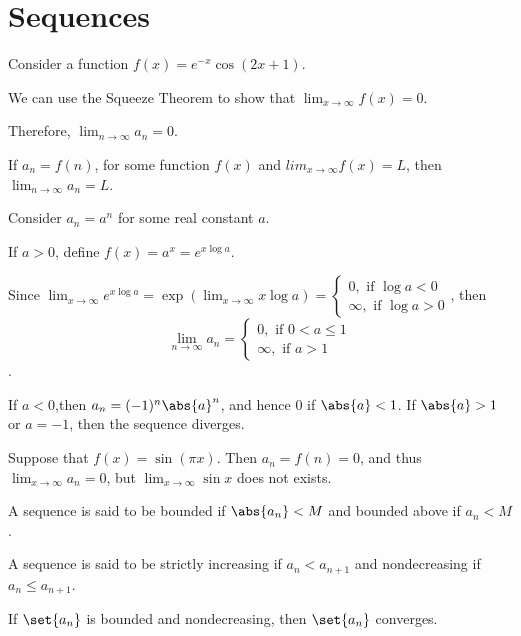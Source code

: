 \documentclass[11pt]{scrartcl}
\begin{document}
\section{Sequences}

Consider a function $f(x) = e^{-x}\cos(2x+1)$.

We can use the Squeeze Theorem to show that $\lim_{x\to \infty}f(x) = 0$.

Therefore, $\lim_{n\to \infty}a_n = 0$.

\begin{theorem}
  If $a_n = f(n)$, for some function $f(x)$ and
  $lim_{x\to \infty} f(x) = L$, then $\lim_{n\to \infty} a_n = L$.
\end{theorem}

\begin{example}

  Consider $a_{n} = a^n$ for some real constant $a$.

  If $a > 0$, define $f(x) = a^x = e^{x\log a}$.

  Since $\lim_{x\to \infty} e ^{x\log a} = \exp(\lim_{x\to \infty} x \log a) =
  \begin{cases}
    0, \text{ if } \log a < 0\\
    \infty, \text{ if } \log a > 0
  \end{cases}$, then \[\lim _{n\to \infty}a_{n} =
  \begin{cases}
    0, \text{ if } 0 < a \leq 1\\
    \infty, \text{ if } a  > 1
  \end{cases}\].

If $a <0$,then $a_{n} = (-1)^n \abs{a}^n$, and hence $0$ if
$\abs{a}< 1$. If $\abs{a}> 1$ or $a = -1$, then the sequence diverges.

\end{example}

\begin{example}

  Suppose that $f(x) = \sin(\pi x)$. Then $a_n = f(n) = 0$, and thus
  $\lim_{x\to \infty} a_n = 0$, but $\lim_{x\to \infty}\sin x $ does
  not exists.

\end{example}

A sequence is said to be bounded if $\abs{a_n} < M$ and bounded above if $a_n< M$.

A sequence is said to be strictly increasing if $a_n < a_{n+1}$ and nondecreasing if $a_n\leq a_{n+1}$.

\begin{theorem}
  If $\set{a_{n}}$ is bounded and nondecreasing, then $\set{a_n}$ converges.
\end{theorem}
\end{document}
